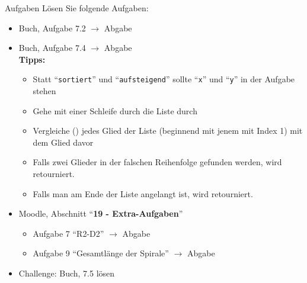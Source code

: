 \begin{frame}{Aufgaben}
	Lösen Sie folgende Aufgaben:
	\begin{itemize}
	    \item Buch, Aufgabe 7.2 $\rightarrow$ Abgabe
	    \item Buch, Aufgabe 7.4 $\rightarrow$ Abgabe\\
	    \textbf{Tipps:}
	    	    \begin{itemize}
	    	    	\item {} Statt ``\texttt{sortiert}'' und ``\texttt{aufsteigend}'' sollte ``\texttt{x}'' und ``\texttt{y}'' in der Aufgabe stehen
	    	    	\item Gehe mit einer Schleife durch die Liste durch
	    	    	\item Vergleiche () jedes Glied der Liste (beginnend mit jenem mit Index 1) mit dem Glied davor
	    	    	\item Falls zwei Glieder in der falschen Reihenfolge gefunden werden, wird  retourniert.
	    	    	\item Falls man am Ende der Liste angelangt ist, wird  retourniert.
	    	    \end{itemize}
	    \item Moodle, Abschnitt ``\textbf{19 -  Extra-Aufgaben}''
	    \begin{itemize}
	    \item Aufgabe 7 ``R2-D2'' $\rightarrow$ Abgabe
	    \item Aufgabe 9 ``Gesamtlänge der Spirale'' $\rightarrow$ Abgabe
	    \end{itemize}
	    \item {} Challenge: Buch, 7.5 lösen
	\end{itemize}
\end{frame}
